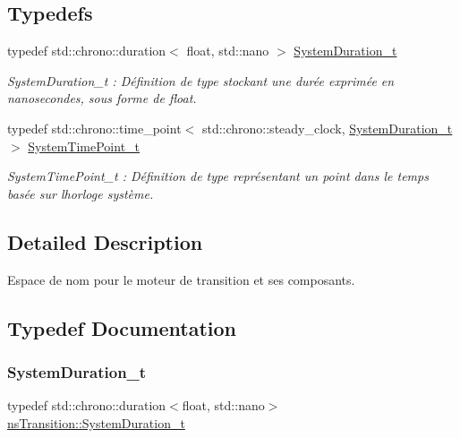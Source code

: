 \subsection*{Typedefs}
\begin{DoxyCompactItemize}
\item 
typedef std\+::chrono\+::duration$<$ float, std\+::nano $>$ \hyperlink{namespacens_transition_a260258f249f46ff9a62da721537f87af}{System\+Duration\+\_\+t}
\begin{DoxyCompactList}\small\item\em System\+Duration\+\_\+t \+: Définition de type stockant une durée exprimée en nanosecondes, sous forme de float. \end{DoxyCompactList}\item 
typedef std\+::chrono\+::time\+\_\+point$<$ std\+::chrono\+::steady\+\_\+clock, \hyperlink{namespacens_transition_a260258f249f46ff9a62da721537f87af}{System\+Duration\+\_\+t} $>$ \hyperlink{namespacens_transition_a83c5a8a16c957b737d76d281c7345aa6}{System\+Time\+Point\+\_\+t}
\begin{DoxyCompactList}\small\item\em System\+Time\+Point\+\_\+t \+: Définition de type représentant un point dans le temps basée sur l\textquotesingle{}horloge système. \end{DoxyCompactList}\end{DoxyCompactItemize}


\subsection{Detailed Description}
Espace de nom pour le moteur de transition et ses composants. 

\subsection{Typedef Documentation}
\mbox{\label{namespacens_transition_a260258f249f46ff9a62da721537f87af}} 
\subsubsection{\texorpdfstring{System\+Duration\+\_\+t}{SystemDuration\_t}}
{\footnotesize\ttfamily typedef std\+::chrono\+::duration$<$float, std\+::nano$>$ \hyperlink{namespacens_transition_a260258f249f46ff9a62da721537f87af}{ns\+Transition\+::\+System\+Duration\+\_\+t}}



